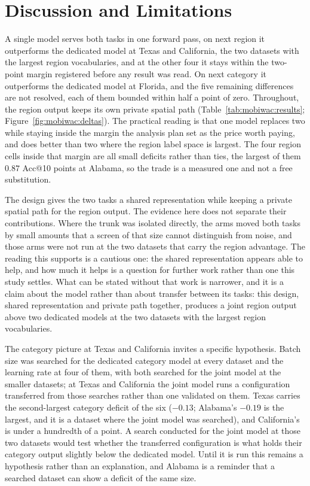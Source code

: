 \section{Discussion and Limitations}
\label{sec:mobiwac:discussion}

A single model serves both tasks in one forward pass, on next region it outperforms the dedicated
model at Texas and California, the two datasets with the largest region vocabularies, and at the
other four it stays within the two-point margin registered before any result was read. On next
category it outperforms the dedicated model at Florida, and the five remaining differences are not
resolved, each of them bounded within half a point of zero. Throughout, the region output keeps its
own private spatial path (Table~\ref{tab:mobiwac:results}; Figure~\ref{fig:mobiwac:deltas}). The
practical reading is that one model replaces two while staying inside the margin the analysis plan
set as the price worth paying, and does better than two where the region label space is largest.
The four region cells inside that margin are all small deficits rather than ties, the largest of
them $0.87$ Acc@10 points at Alabama, so the trade is a measured one and not a free substitution.

The design gives the two tasks a shared representation while keeping a private spatial path for the
region output. The evidence here does not separate their contributions. Where the trunk was isolated
directly, the arms moved both tasks by small amounts that a screen of that size cannot distinguish
from noise, and those arms were not run at the two datasets that carry the region advantage. The
reading this supports is a cautious one: the shared representation appears able to help, and how much
it helps is a question for further work rather than one this study settles. What can be stated
without that work is narrower, and it is a claim about the model rather than about transfer between
its tasks: this design, shared representation and private path together, produces a joint region
output above two dedicated models at the two datasets with the largest region vocabularies.

The category picture at Texas and California invites a specific hypothesis. Batch size was searched
for the dedicated category model at every dataset and the learning rate at four of them, with both
searched for the joint model at the smaller datasets; at Texas and California the joint model runs a configuration transferred from
those searches rather than one validated on them. Texas carries the second-largest category deficit
of the six ($-0.13$; Alabama's $-0.19$ is the largest, and it is a dataset where the joint model was
searched), and California's is under a hundredth of a point. A search conducted for the joint model
at those two datasets would test whether the transferred configuration is what holds their category
output slightly below the dedicated model. Until it is run this remains a hypothesis rather than an
explanation, and Alabama is a reminder that a searched dataset can show a deficit of the same size.

